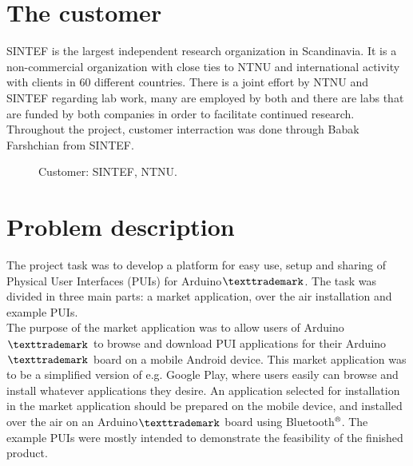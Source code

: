 \section{The customer}
SINTEF is the largest independent research organization in Scandinavia. It is a non-commercial organization with close ties to NTNU and international activity with clients in 60 different countries. There is a joint effort by NTNU and SINTEF regarding lab work, many are employed by both and there are labs that are funded by both companies in order to facilitate continued research. \\
\newline
Throughout the project, customer interraction was done through Babak Farshchian from SINTEF.\\
\begin{figure}[H]
%
\hfill
{}%
\caption{Customer: \protect{\ref{fig:sintef}} SINTEF, \protect{\ref{fig:ntnu}} NTNU.}
\end{figure}

\section{Problem description}
The project task was to develop a platform for easy use, setup and sharing of Physical User Interfaces (PUIs) for Arduino$\texttrademark$. The task was divided in three main parts: a market application, over the air installation and example PUIs.\\
\newline
The purpose of the market application was to allow users of Arduino$\texttrademark$ to browse and download PUI applications for their Arduino$\texttrademark$ board on a mobile Android device. This market application was to be a simplified version of e.g. Google Play, where users easily can browse and install whatever applications they desire. An application selected for installation in the market application should be prepared on the mobile device, and installed over the air on an Arduino$\texttrademark$ board using Bluetooth$\textsuperscript{\textregistered}$. The example PUIs were mostly intended to demonstrate the feasibility of the finished product.

